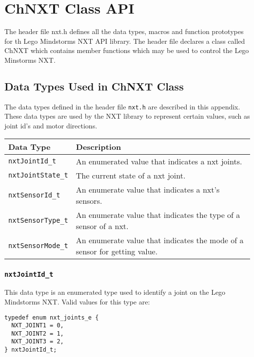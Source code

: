 \section{\label{sec:chnxt_api}ChNXT Class API}
The header file nxt.h defines all the data types, macros and function prototypes 
for th Lego Mindstorms NXT API library. The header file declares a class called 
ChNXT which contains member functions which may be used to control the Lego
Minstorms NXT.\\
\subsection{\label{sec:datatypes}Data Types Used in ChNXT Class}
The data types defined in the header file {\tt nxt.h} are described in this 
appendix. These data types are used by the NXT library to represent certain values, 
such as joint id's and motor directions.\\

\noindent
\begin{longtable}{p{3.5cm}p{12cm}} 
    \hline
    Data Type& Description \\
    \hline 
    {\tt nxtJointId\_t} & An enumerated value that indicates a 
    nxt joints. \\
    {\tt nxtJointState\_t} & The current state of a nxt joint. \\
    {\tt nxtSensorId\_t} & An enumerate value that indicates a 
    nxt's sensors. \\
    {\tt nxtSensorType\_t} & An enumerate value that indicates 
    the type of a sensor of a nxt.\\
    {\tt nxtSensorMode\_t} & An enumerate value that indicates 
    the mode of a sensor for getting value. \\
    \hline
\end{longtable}

\subsubsection{\label{sec:nxtJointId_t}{\tt nxtJointId\_t}}
This data type is an enumerated type used to identify a joint on 
the Lego Mindstorms NXT. Valid values for this type are:
\begin{lstlisting}
typedef enum nxt_joints_e {
  NXT_JOINT1 = 0,
  NXT_JOINT2 = 1,
  NXT_JOINT3 = 2,
} nxtJointId_t;
\end{lstlisting}

